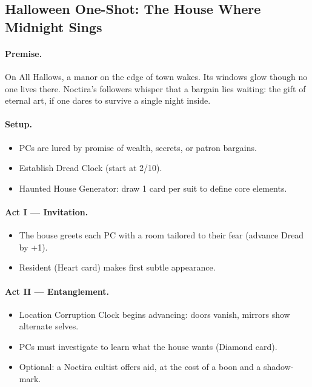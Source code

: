 \documentclass[11pt]{article}
\begin{document}
\subsection{Halloween One-Shot: The House Where Midnight Sings}

\paragraph{Premise.}
On All Hallows, a manor on the edge of town wakes. Its windows glow though no one lives there. Noctira’s followers whisper that a bargain lies waiting: the gift of eternal art, if one dares to survive a single night inside.

\paragraph{Setup.}
\begin{itemize}
  \item PCs are lured by promise of wealth, secrets, or patron bargains.
  \item Establish Dread Clock (start at 2/10).
  \item Haunted House Generator: draw 1 card per suit to define core elements.
\end{itemize}

\paragraph{Act I — Invitation.}
\begin{itemize}
  \item The house greets each PC with a room tailored to their fear (advance Dread by +1).
  \item Resident (Heart card) makes first subtle appearance.
\end{itemize}

\paragraph{Act II — Entanglement.}
\begin{itemize}
  \item Location Corruption Clock begins advancing: doors vanish, mirrors show alternate selves.
  \item PCs must investigate to learn what the house wants (Diamond card).
  \item Optional: a Noctira cultist offers aid, at the cost of a boon and a shadow-mark.
\end{itemize}
\end{document}
